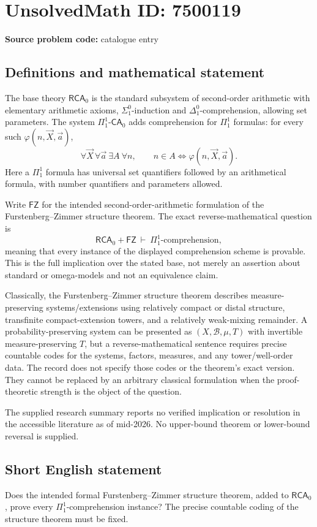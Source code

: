 \documentclass[11pt]{article}
\begin{document}
\section*{UnsolvedMath ID: 7500119}
\textbf{Source problem code:} catalogue entry
\subsection{Definitions and mathematical statement}
The base theory \(\mathsf{RCA}_0\) is the standard subsystem of second-order arithmetic with elementary arithmetic axioms, \(\Sigma^0_1\)-induction and \(\Delta^0_1\)-comprehension, allowing set parameters. The system \(\Pi^1_1\text{-}\mathsf{CA}_0\) adds comprehension for \(\Pi^1_1\) formulas: for every such \(\varphi(n,\vec X,\vec a)\),
\[
\forall\vec X\,\forall\vec a\ \exists A\ \forall n,
\qquad n\in A\iff\varphi(n,\vec X,\vec a).
\]
Here a \(\Pi^1_1\) formula has universal set quantifiers followed by an arithmetical formula, with number quantifiers and parameters allowed.

Write \(\mathsf{FZ}\) for the intended second-order-arithmetic formulation of the Furstenberg--Zimmer structure theorem. The exact reverse-mathematical question is
\[
\mathsf{RCA}_0+\mathsf{FZ}\ \vdash\
\Pi^1_1\text{-comprehension},
\]
meaning that every instance of the displayed comprehension scheme is provable. This is the full implication over the stated base, not merely an assertion about standard or omega-models and not an equivalence claim.

Classically, the Furstenberg--Zimmer structure theorem describes measure-preserving systems/extensions using relatively compact or distal structure, transfinite compact-extension towers, and a relatively weak-mixing remainder. A probability-preserving system can be presented as \((X,\mathcal B,\mu,T)\) with invertible measure-preserving \(T\), but a reverse-mathematical sentence requires precise countable codes for the systems, factors, measures, and any tower/well-order data. The record does not specify those codes or the theorem's exact version. They cannot be replaced by an arbitrary classical formulation when the proof-theoretic strength is the object of the question.

The supplied research summary reports no verified implication or resolution in the accessible literature as of mid-2026. No upper-bound theorem or lower-bound reversal is supplied.
\subsection{Short English statement}
Does the intended formal Furstenberg--Zimmer structure theorem, added to \(\mathsf{RCA}_0\), prove every \(\Pi^1_1\)-comprehension instance? The precise countable coding of the structure theorem must be fixed.
\end{document}
